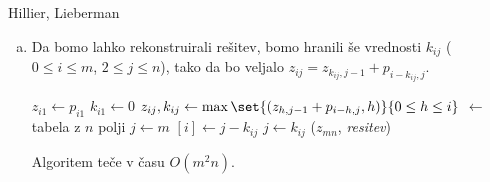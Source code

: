 \begin{naloga}{Hillier, Lieberman}{\cite[Problem~11.3-1]{hl}}
\begin{odgovor}
\begin{enumerate}[(a)]
\item Da bomo lahko rekonstruirali rešitev,
bomo hranili še vrednosti $k_{ij}$ ($0 \le i \le m$, $2 \le j \le n$),
tako da bo veljalo $z_{ij} = z_{k_{ij},j-1} + p_{i-k_{ij},j}$.
\begin{small}
\begin{algorithmic}
        \State $z_{i1} \gets p_{i1}$
        \State $k_{i1} \gets 0$
    \EndFor
            \State $z_{ij}, k_{ij} \gets
                \max\set{(z_{h,j-1} + p_{i-h,j}, h)}{0 \le h \le i}$
        \EndFor
    \EndFor
     $\gets$ tabela z $n$ polji
    \State $j \gets m$
        $[i] \gets j - k_{ij}$
        \State $j \gets k_{ij}$
    \EndFor
    \State \Return ($z_{mn}$, {\sl resitev})
\EndFunction
\end{algorithmic}
\end{small}
Algoritem teče v času $O(m^2 n)$.
\end{enumerate}
\end{odgovor}
\end{naloga}
